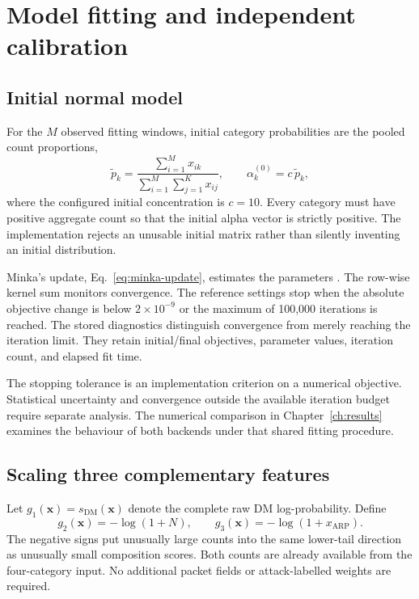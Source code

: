 \section{Model fitting and independent calibration}
\label{sec:calibration}

\subsection{Initial normal model}

For the $M$ observed fitting windows, initial category probabilities are
the pooled count proportions,
\[
 \widetilde p_k=\frac{\sum_{i=1}^{M}x_{ik}}
                       {\sum_{i=1}^{M}\sum_{j=1}^{K}x_{ij}},
 \qquad \alpha_k^{(0)}=c\,\widetilde p_k,
\]
where the configured initial concentration is $c=10$. Every category
must have positive aggregate count so that the initial alpha vector is
strictly positive. The implementation rejects an unusable initial matrix
rather than silently inventing an initial distribution.

Minka's update, Eq.~\eqref{eq:minka-update}, estimates the parameters
\cite{minka2000}. The row-wise kernel sum monitors convergence. The
reference settings stop when the absolute objective change is below
$2\times10^{-9}$ or the maximum of 100,000 iterations is reached. The
stored diagnostics distinguish convergence from merely reaching the
iteration limit. They retain initial/final objectives, parameter values,
iteration count, and elapsed fit time.

The stopping tolerance is an implementation criterion on a numerical
objective. Statistical uncertainty and convergence outside the available
iteration budget require separate analysis. The numerical comparison in
Chapter~\ref{ch:results} examines the behaviour of both backends under
that shared fitting procedure.

\subsection{Scaling three complementary features}

Let $g_1(\boldsymbol{x})=s_{\mathrm{DM}}(\boldsymbol{x})$ denote the
complete raw DM log-probability. Define
\[
 g_2(\boldsymbol{x})=-\log(1+N),\qquad
 g_3(\boldsymbol{x})=-\log(1+x_{\mathrm{ARP}}).
\]
The negative signs put unusually large counts into the same lower-tail
direction as unusually small composition scores. Both counts are already
available from the four-category input. No additional packet fields or
attack-labelled weights are required.

